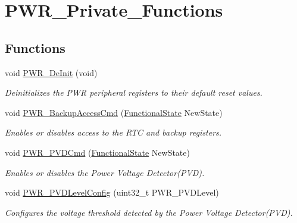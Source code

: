 \hypertarget{group___p_w_r___private___functions}{}\section{P\+W\+R\+\_\+\+Private\+\_\+\+Functions}
\label{group___p_w_r___private___functions}
\subsection*{Functions}
\begin{DoxyCompactItemize}
\item 
void \mbox{\hyperlink{group___p_w_r___private___functions_gad03a0aac7bc3bc3a9fd012f3769a6990}{P\+W\+R\+\_\+\+De\+Init}} (void)
\begin{DoxyCompactList}\small\item\em Deinitializes the P\+WR peripheral registers to their default reset values. \end{DoxyCompactList}\item 
void \mbox{\hyperlink{group___p_w_r___private___functions_ga0741aea35572b1a75f82b74de12df800}{P\+W\+R\+\_\+\+Backup\+Access\+Cmd}} (\mbox{\hyperlink{group___exported__types_gac9a7e9a35d2513ec15c3b537aaa4fba1}{Functional\+State}} New\+State)
\begin{DoxyCompactList}\small\item\em Enables or disables access to the R\+TC and backup registers. \end{DoxyCompactList}\item 
void \mbox{\hyperlink{group___p_w_r___private___functions_ga42cad476b816e0a33594a933b3ed1acd}{P\+W\+R\+\_\+\+P\+V\+D\+Cmd}} (\mbox{\hyperlink{group___exported__types_gac9a7e9a35d2513ec15c3b537aaa4fba1}{Functional\+State}} New\+State)
\begin{DoxyCompactList}\small\item\em Enables or disables the Power Voltage Detector(\+P\+V\+D). \end{DoxyCompactList}\item 
void \mbox{\hyperlink{group___p_w_r___private___functions_ga237c143ef6aa55abb8049fa7bf24ab8f}{P\+W\+R\+\_\+\+P\+V\+D\+Level\+Config}} (uint32\+\_\+t P\+W\+R\+\_\+\+P\+V\+D\+Level)
\begin{DoxyCompactList}\small\item\em Configures the voltage threshold detected by the Power Voltage Detector(\+P\+V\+D). \end{DoxyCompactList}\item 

\end{DoxyCompactItemize}
